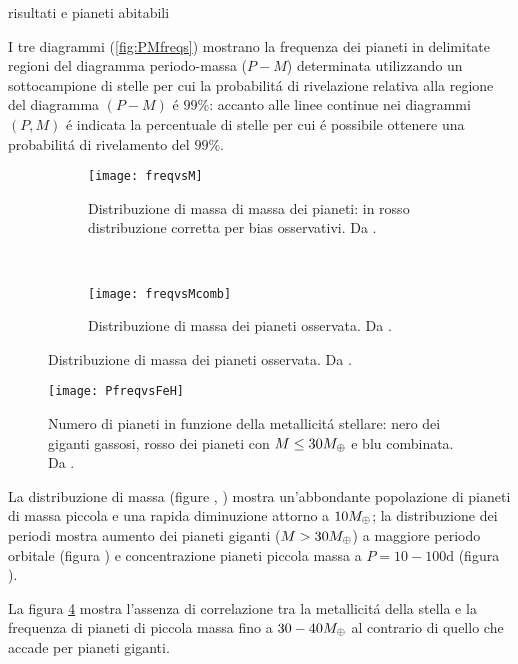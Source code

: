 \begin{workout}
risultati e pianeti abitabili
\end{workout}

I tre diagrammi (\ref{fig:PMfreqs}) mostrano la frequenza dei pianeti in delimitate regioni del diagramma periodo-massa ($P-M$) determinata utilizzando un sottocampione di stelle per cui la probabilit\'a di rivelazione relativa alla regione del diagramma $(P-M)$ \'e $99\%$: accanto alle linee continue nei diagrammi $(P,M)$ \'e indicata la percentuale di stelle per cui \'e possibile ottenere una probabilit\'a di rivelamento del $99\%$.

\begin{figure}[!ht]
\begin{subfigure}[b]{0.49\textwidth} \centering \texttt{[image: freqvsM]}
\caption{Distribuzione di massa di massa dei pianeti: in rosso distribuzione corretta per bias osservativi. Da \cite{mayor2011harps}.}\label{fig:freqvsM}
\end{subfigure}
~
\begin{subfigure}[b]{0.49\textwidth} \centering \texttt{[image: freqvsMcomb]}
\caption{Distribuzione di massa dei pianeti osservata. Da \cite{mayor2011harps}.}\label{fig:freqvsMcomb}
\end{subfigure}
\end{figure}

\begin{figure}[!ht]
\centering \texttt{[image: PfreqvsFeH]}
\caption{Numero di pianeti in funzione della metallicit\'a stellare: nero dei giganti gassosi, rosso dei pianeti con $M\leq30M_{\oplus}{}$ e blu combinata. Da \cite{mayor2011harps}.}\label{fig:PfreqvsFeH}
\end{figure}

La distribuzione di massa (figure , ) mostra un'abbondante popolazione di pianeti di massa piccola e una rapida diminuzione attorno a $10M_{\oplus}{}$; la distribuzione dei periodi mostra aumento dei pianeti giganti ($M>30M_{\oplus}{}$) a maggiore periodo orbitale (figura ) e concentrazione pianeti piccola massa a $P=10-100\si{\day}$ (figura ).

La figura \ref{fig:PfreqvsFeH} mostra l'assenza di correlazione tra la metallicit\'a della stella e la frequenza di pianeti di piccola massa fino a $30-40M_{\oplus}{}$ al contrario di quello che accade per pianeti giganti.

